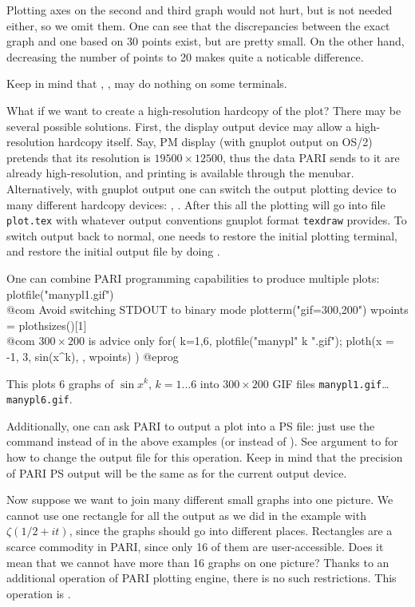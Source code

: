 \noindent Plotting axes on the second and third graph would not hurt, but
is not needed either, so we omit them.  One can see that the discrepancies
between the exact graph and one based on 30 points exist, but are pretty
small.  On the other hand, decreasing the number of points to 20 makes
quite a noticable difference.

Keep in mind that , ,
 may do nothing on some terminals.  

What if we
want to create a high-resolution hardcopy of the plot?  There may be several
possible solutions.  First, the display output device may allow a
high-resolution hardcopy itself.  Say, PM display (with gnuplot output on
OS/2) pretends that its resolution is $19500\times 12500$, thus the data
PARI sends to it are already high-resolution, and printing is available
through the menubar.  Alternatively, with gnuplot output one can switch
the output plotting device to many different hardcopy devices:
, .
After this all the plotting will go into file {\tt plot.tex} with whatever
output conventions gnuplot format {\tt texdraw} provides.  To switch output
back to normal, one needs to restore the initial plotting terminal, and
restore the initial output file by doing .

One can combine PARI programming capabilities to produce multiple plots:
\bprog
plotfile("manypl1.gif")       \\@com Avoid switching STDOUT to binary mode
plotterm("gif=300,200")
wpoints = plothsizes()[1]     \\@com $300 \times 200$ is advice only
{
  for( k=1,6,
    plotfile("manypl" k ".gif");
    ploth(x = -1, 3, sin(x^k), , wpoints)
  )
}
@eprog

\noindent This plots 6 graphs of $\sin x^k$, $k=1\dots 6$ into 
$300\times 200$ GIF files {\tt manypl1.gif}\dots {\tt manypl6.gif}.

Additionally, one can ask PARI to output a plot into a PS file: just
use the command  instead of  in the above examples
(or  instead of ).  See  argument
to  for how to change the output file for this operation.  Keep
in mind that the precision of PARI PS output will be the same as for the
current output device.

Now suppose we want to join many different small graphs into one picture.
We cannot use one rectangle for all the output as we did in the example
with $\zeta({1/2}+it)$, since the graphs should go into different places.
Rectangles are a scarce commodity in PARI, since only 16 of them are
user-accessible.  Does it mean that we cannot have more than 16 graphs on
one picture?  Thanks to an additional operation of PARI plotting engine,
there is no such restrictions.  This operation is .

